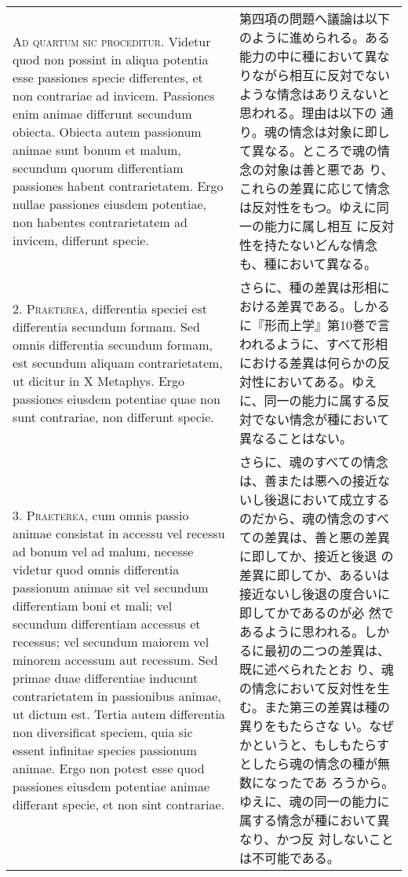 \documentclass[10pt]{jsarticle} %
\begin{document}
\begin{longtable}{p{21em}p{21em}}

{\scshape Ad quartum sic proceditur}. Videtur quod non possint in aliqua potentia
esse passiones specie differentes, et non contrariae ad
invicem. Passiones enim animae differunt secundum obiecta. Obiecta autem
passionum animae sunt bonum et malum, secundum quorum differentiam
passiones habent contrarietatem. Ergo nullae passiones eiusdem
potentiae, non habentes contrarietatem ad invicem, differunt specie.

&

第四項の問題へ議論は以下のように進められる。ある能力の中に種において異な
 りながら相互に反対でないような情念はありえないと思われる。理由は以下の
 通り。魂の情念は対象に即して異なる。ところで魂の情念の対象は善と悪であ
 り、これらの差異に応じて情念は反対性をもつ。ゆえに同一の能力に属し相互
 に反対性を持たないどんな情念も、種において異なる。

\\



2. {\scshape Praeterea}, differentia speciei est differentia secundum formam. Sed
omnis differentia secundum formam, est secundum aliquam contrarietatem,
ut dicitur in X Metaphys. Ergo passiones eiusdem potentiae quae non sunt
contrariae, non differunt specie.

&

さらに、種の差異は形相における差異である。しかるに『形而上学』第10巻で言
 われるように、すべて形相における差異は何らかの反対性においてある。ゆえ
 に、同一の能力に属する反対でない情念が種において異なることはない。

\\



3. {\scshape Praeterea}, cum omnis passio animae consistat in accessu vel recessu ad
bonum vel ad malum, necesse videtur quod omnis differentia passionum
animae sit vel secundum differentiam boni et mali; vel secundum
differentiam accessus et recessus; vel secundum maiorem vel minorem
accessum aut recessum. Sed primae duae differentiae inducunt
contrarietatem in passionibus animae, ut dictum est. Tertia autem
differentia non diversificat speciem, quia sic essent infinitae species
passionum animae. Ergo non potest esse quod passiones eiusdem potentiae
animae differant specie, et non sint contrariae.

&

さらに、魂のすべての情念は、善または悪への接近ないし後退において成立する
 のだから、魂の情念のすべての差異は、善と悪の差異に即してか、接近と後退
 の差異に即してか、あるいは接近ないし後退の度合いに即してかであるのが必
 然であるように思われる。しかるに最初の二つの差異は、既に述べられたとお
 り、魂の情念において反対性を生む。また第三の差異は種の異りをもたらさな
 い。なぜかというと、もしもたらすとしたら魂の情念の種が無数になったであ
 ろうから。ゆえに、魂の同一の能力に属する情念が種において異なり、かつ反
 対しないことは不可能である。


\end{longtable}
\end{document}
